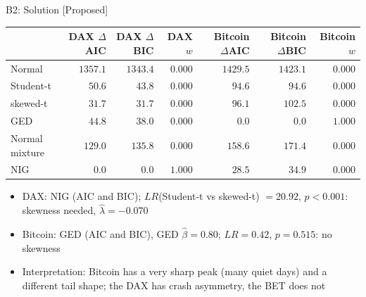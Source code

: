 \ifsolutions
\begin{frame}{B2: Solution [Proposed]}
\itemsize{\footnotesize}
\begin{center}
\scriptsize
\begin{tabular}{lrrrrrr}
\toprule
& DAX $\Delta$AIC & DAX $\Delta$BIC & DAX $w$ & Bitcoin $\Delta$AIC & Bitcoin $\Delta$BIC & Bitcoin $w$ \\
\midrule
Normal & $1357.1$ & $1343.4$ & $0.000$ & $1429.5$ & $1423.1$ & $0.000$ \\
Student-t & $50.6$ & $43.8$ & $0.000$ & $94.6$ & $94.6$ & $0.000$ \\
skewed-t & $31.7$ & $31.7$ & $0.000$ & $96.1$ & $102.5$ & $0.000$ \\
GED & $44.8$ & $38.0$ & $0.000$ & $0.0$ & $0.0$ & $1.000$ \\
Normal mixture & $129.0$ & $135.8$ & $0.000$ & $158.6$ & $171.4$ & $0.000$ \\
NIG & $0.0$ & $0.0$ & $1.000$ & $28.5$ & $34.9$ & $0.000$ \\
\bottomrule
\end{tabular}
\end{center}
\begin{itemize}
    \item DAX: NIG (AIC and BIC); $LR$(Student-t vs skewed-t) $= 20.92$, $p <0.001$: skewness needed, $\hat\lambda = -0.070$
    \item Bitcoin: GED (AIC and BIC), GED $\hat\beta = 0.80$; $LR = 0.42$, $p = 0.515$: no skewness
    \item Interpretation: Bitcoin has a very sharp peak (many quiet days) and a different tail shape; the DAX has crash asymmetry, the BET does not
\end{itemize}
\end{frame}
\fi

